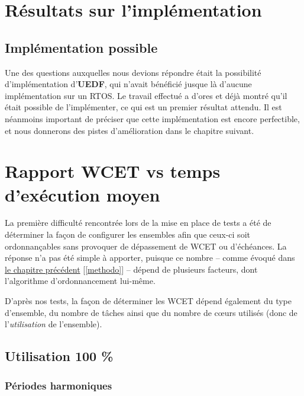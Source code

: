 
\section{Résultats sur l'implémentation}
\label{resultats}

	\subsection{Implémentation possible}
	
	Une des questions auxquelles nous devions répondre était la possibilité d'implémentation d'\textbf{UEDF}, qui 
	n'avait bénéficié jusque là d'aucune implémentation sur un RTOS.
	Le travail effectué a d'ores et déjà montré qu'il était possible de l'implémenter, ce qui est un premier résultat attendu.
	Il est néanmoins important de préciser que cette implémentation est encore 
	perfectible, et nous donnerons des pistes d'amélioration dans le chapitre suivant. \newline
	
\section{Rapport WCET vs temps d'exécution moyen}

	La première difficulté rencontrée lors de la mise en place de tests a été de déterminer la façon 
	de configurer les ensembles afin que ceux-ci soit ordonnançables sans provoquer de 
	dépassement de WCET ou d'échéances. La réponse n'a pas été simple à apporter, puisque ce nombre -- comme 
	évoqué dans \hyperref[methodo]{le chapitre précédent} [\ref{methodo}] -- dépend de plusieurs facteurs, dont 
	l'algorithme d'ordonnancement lui-même. \newline
	
	D'après nos tests, la façon de déterminer les WCET dépend également du type d'ensemble, du nombre de tâches 
	ainsi que du nombre de cœurs utilisés (donc de l'\textit{utilisation} de l'ensemble).\newline
	
	
	\subsection{Utilisation 100 \%}
	
	\subsubsection{Périodes harmoniques}
	
